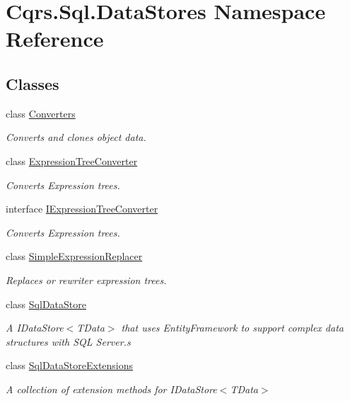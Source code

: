 \hypertarget{namespaceCqrs_1_1Sql_1_1DataStores}{}\section{Cqrs.\+Sql.\+Data\+Stores Namespace Reference}
\label{namespaceCqrs_1_1Sql_1_1DataStores}
\subsection*{Classes}
\begin{DoxyCompactItemize}
\item 
class \hyperlink{classCqrs_1_1Sql_1_1DataStores_1_1Converters}{Converters}
\begin{DoxyCompactList}\small\item\em Converts and clones object data. \end{DoxyCompactList}\item 
class \hyperlink{classCqrs_1_1Sql_1_1DataStores_1_1ExpressionTreeConverter}{Expression\+Tree\+Converter}
\begin{DoxyCompactList}\small\item\em Converts Expression trees. \end{DoxyCompactList}\item 
interface \hyperlink{interfaceCqrs_1_1Sql_1_1DataStores_1_1IExpressionTreeConverter}{I\+Expression\+Tree\+Converter}
\begin{DoxyCompactList}\small\item\em Converts Expression trees. \end{DoxyCompactList}\item 
class \hyperlink{classCqrs_1_1Sql_1_1DataStores_1_1SimpleExpressionReplacer}{Simple\+Expression\+Replacer}
\begin{DoxyCompactList}\small\item\em Replaces or rewriter expression trees. \end{DoxyCompactList}\item 
class \hyperlink{classCqrs_1_1Sql_1_1DataStores_1_1SqlDataStore}{Sql\+Data\+Store}
\begin{DoxyCompactList}\small\item\em A I\+Data\+Store$<$\+T\+Data$>$ that uses Entity\+Framework to support complex data structures with S\+QL Server.\+s \end{DoxyCompactList}\item 
class \hyperlink{classCqrs_1_1Sql_1_1DataStores_1_1SqlDataStoreExtensions}{Sql\+Data\+Store\+Extensions}
\begin{DoxyCompactList}\small\item\em A collection of extension methods for I\+Data\+Store$<$\+T\+Data$>$ \end{DoxyCompactList}\end{DoxyCompactItemize}
